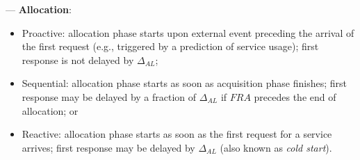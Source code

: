 
--- \textbf{Allocation}:


\begin{itemize}

\item Proactive: allocation phase starts upon external event preceding the arrival of the first request (e.g., triggered by a prediction of service usage); first response is not delayed by $\Delta_{AL}$;

\item Sequential: allocation phase starts as soon as acquisition phase finishes; first response may be delayed by a fraction of $\Delta_{AL}$ if $FRA$ precedes the end of allocation; or

\item Reactive: allocation phase starts as soon as the first request for a service arrives; first response may be delayed by $\Delta_{AL}$ (also known as \textit{cold start}).

\end{itemize}

%
%
%
%



%
%
%


